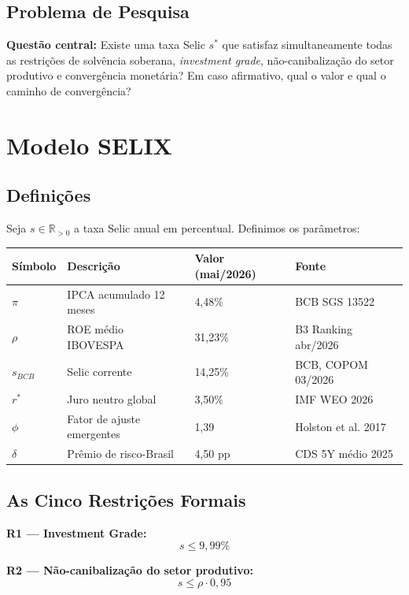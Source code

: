 \documentclass[12pt,a4paper]{article}
\begin{document}
\subsection{Problema de Pesquisa}

\noindent \textbf{Questão central:} Existe uma taxa Selic $s^*$ que satisfaz simultaneamente todas as restrições de solvência soberana, \textit{investment grade}, não-canibalização do setor produtivo e convergência monetária? Em caso afirmativo, qual o valor e qual o caminho de convergência?

\section{Modelo SELIX}

\subsection{Definições}

Seja $s \in \mathbb{R}_{>0}$ a taxa Selic anual em percentual. Definimos os parâmetros:

\begin{table}[H]
\centering
\begin{tabular}{llll}
\toprule
Símbolo & Descrição & Valor (mai/2026) & Fonte \\
\midrule
$\pi$ & IPCA acumulado 12 meses & 4,48\% & BCB SGS 13522 \\
$\rho$ & ROE médio IBOVESPA & 31,23\% & B3 Ranking abr/2026 \\
$s_{BCB}$ & Selic corrente & 14,25\% & BCB, COPOM 03/2026 \\
$r^*$ & Juro neutro global & 3,50\% & IMF WEO 2026 \\
$\phi$ & Fator de ajuste emergentes & 1,39 & Holston et al. 2017 \\
$\delta$ & Prêmio de risco-Brasil & 4,50 pp & CDS 5Y médio 2025 \\
\bottomrule
\end{tabular}
\end{table}

\subsection{As Cinco Restrições Formais}

\textbf{R1 — Investment Grade:}
\[
s \leq 9,99\%
\]

\textbf{R2 — Não-canibalização do setor produtivo:}
\[
s \leq \rho \cdot 0,95
\]
\end{document}
